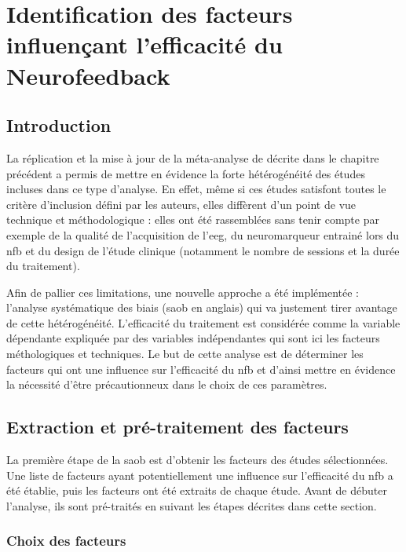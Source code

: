 \chapter{Identification des facteurs influençant l'efficacité du Neurofeedback}

\section*{Introduction}

La réplication et la mise à jour de la méta-analyse de \citet{Cortese2016} décrite dans le chapitre précédent a permis de mettre en évidence la forte hétérogénéité des études incluses dans ce type d'analyse. 
En effet, même si ces études satisfont toutes le critère d'inclusion défini par les auteurs, elles diffèrent d'un point de vue technique et méthodologique : elles ont été rassemblées 
sans tenir compte par exemple de la qualité de l'acquisition de l'\gls{eeg}, du neuromarqueur entrainé lors du \gls{nfb} et du design de l'étude clinique (notamment le nombre de 
sessions et la durée du traitement). 

Afin de pallier ces limitations, une nouvelle approche a été implémentée : l'analyse systématique des biais (\gls{saob} en anglais) qui va justement tirer avantage de cette hétérogénéité. 
 L'efficacité du traitement est considérée comme la variable dépendante expliquée par des variables indépendantes qui sont ici les facteurs méthologiques et techniques. 
Le but de cette analyse est de déterminer les facteurs qui ont une influence sur l'efficacité du \gls{nfb} et d'ainsi mettre en évidence la nécessité d'être
précautionneux dans le choix de ces paramètres. 

\section{Extraction et pré-traitement des facteurs}

La première étape de la \gls{saob} est d'obtenir les facteurs des études sélectionnées. Une liste de facteurs ayant potentiellement une influence sur l'efficacité du \gls{nfb} a été 
établie, puis les facteurs ont été extraits de chaque étude. Avant de débuter l'analyse, ils sont pré-traités en suivant les étapes décrites dans cette section. 

\subsection{Choix des facteurs} \label{choix_des_facteurs}

